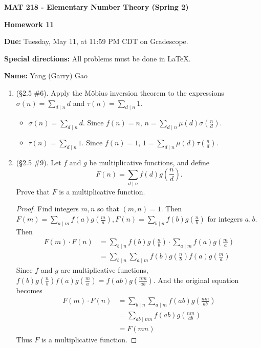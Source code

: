 \documentclass[11pt,a4paper]{article}
\begin{document}
\begin{Large}
\centerline{\bf MAT 218 - Elementary Number Theory (Spring 2)}\medskip
\centerline{\bf Homework 11}\medskip
\end{Large}
{\bf Due:} Tuesday, May 11, at 11:59 PM CDT on Gradescope.

{\bf Special directions:}  All problems must be done in \LaTeX.

{\bf Name:} Yang (Garry) Gao

\hrulefill

\begin{enumerate}

	\item (\S 2.5 \#6). Apply the M\"{o}bius inversion theorem to the expressions \(\sigma(n) = \sum_{d \mid n} d\) and \( \tau(n) = \sum_{d \mid n} 1\).

	\begin{itemize}
		\item \(\sigma(n) = \sum_{d \mid n} d.\) Since $f(n) = n$, $n = \sum_{d\mid n} \mu(d) \sigma(\frac{n}{d}).$
		\item \( \tau(n) = \sum_{d \mid n} 1.\) Since $f(n) = 1$, $1 = \sum_{d\mid n} \mu(d) \tau(\frac{n}{d}).$
	\end{itemize}

	\item (\S 2.5 \#9). Let \(f\) and \(g\) be multiplicative functions, and define
	\[ F(n) = \sum_{d \mid n} f(d)g\!\left(\frac{n}{d}\right). \]
	Prove that \(F\) is a multiplicative function.

	\begin{proof}
		Find integers $m,n$ so that $(m,n) = 1.$ Then \( F(m) = \sum_{a \mid m} f(a)g\!\left(\frac{m}{a}\right), F(n) = \sum_{b \mid n} f(b)g\!\left(\frac{n}{b}\right)\) for integers $a, b.$ Then
		\begin{align*}
		F(m)\cdot F(n) &=  \sum_{b \mid n} f(b)g\!\left(\frac{n}{b}\right) \cdot \sum_{a \mid m} f(a)g\!\left(\frac{m}{a}\right) \\
		&= \sum_{b \mid n} \sum_{a \mid m} f(b)g\!\left(\frac{n}{b}\right) f(a)g\!\left(\frac{m}{a}\right)
		\end{align*}
		Since \(f\) and \(g\) are multiplicative functions, $f(b)g\!\left(\frac{n}{b}\right) f(a)g\!\left(\frac{m}{a}\right) = f(ab)g(\frac{nm}{ab}).$ And the original equation becomes
		\begin{align*}
		F(m)\cdot F(n) &= \sum_{b \mid n} \sum_{a \mid m} f(ab)g(\frac{nm}{ab}) \\
		&= \sum_{ab \mid mn} f(ab)g(\frac{nm}{ab}) \\
		&= F(mn)
		\end{align*}
		Thus \(F\) is a multiplicative function.
	\end{proof}


\end{enumerate}
\end{document}
